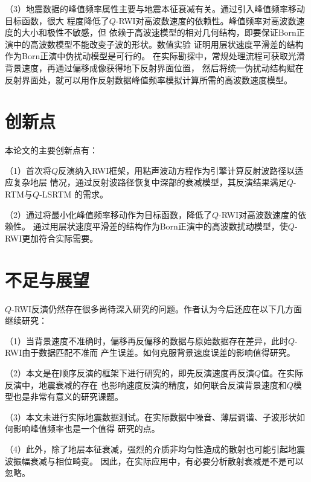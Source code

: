 （3）地震数据的峰值频率属性主要与地震本征衰减有关。通过引入峰值频率移动目标函数，很大
程度降低了$Q$-RWI对高波数速度的依赖性。峰值频率对高波数速度的大小和极性不敏感，但
依赖于高波速模型的相对几何结构，即要保证Born正演中的高波数模型不能改变子波的形状。数值实验
证明用层状速度平滑差的结构作为Born正演中伪扰动模型是可行的。
在实际勘探中，常规处理流程可获取光滑背景速度，再通过偏移成像获得地下反射界面位置，
然后将统一伪扰动结构赋在反射界面处，就可以用作反射数据峰值频率模拟计算所需的高波数速度模型。

\vspace{1.0cm}
\section{创新点}
\vspace{0.2cm}

本论文的主要创新点有：

（1）首次将$Q$反演纳入RWI框架，用粘声波动方程作为引擎计算反射波路径以适应复杂地层
情况，通过反射波路径恢复中深部的衰减模型，其反演结果满足$Q$-RTM与$Q$-LSRTM
的需求。

（2）通过将最小化峰值频率移动作为目标函数，降低了$Q$-RWI对高波数速度的依赖性。
通过用层状速度平滑差的结构作为Born正演中的高波数扰动模型，使$Q$-RWI更加符合实际需要。

\vspace{1.0cm}
\section{不足与展望}
\vspace{0.2cm}

$Q$-RWI反演仍然存在很多尚待深入研究的问题。作者认为今后还应在以下几方面
继续研究：

（1）当背景速度不准确时，偏移再反偏移的数据与原始数据存在差异，此时$Q$-RWI由于数据匹配不准而
产生误差。如何克服背景速度误差的影响值得研究。

（2）本文是在顺序反演的框架下进行研究的，即先反演速度再反演$Q$值。在实际反演中，地震衰减的存在
也影响速度反演的精度，如何联合反演背景速度和$Q$模型也是非常有意义的研究课题。

（3）本文未进行实际地震数据测试。在实际数据中噪音、薄层调谐、子波形状如何影响峰值频率也是一个值得
研究的点。

（4）此外，除了地层本征衰减，强烈的介质非均匀性造成的散射也可能引起地震波振幅衰减与相位畸变。
因此，在实际应用中，有必要分析散射衰减是不是可以忽略。
